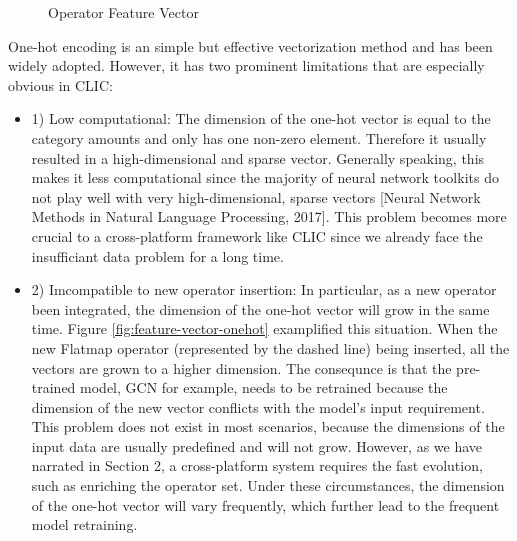 \begin{figure}
  \caption{Operator Feature Vector}
  \label{fig:feature-vector}
\end{figure}

One-hot encoding is an simple but effective vectorization method and has been widely adopted. 
However, it has two prominent limitations that are especially obvious in CLIC:

\begin{itemize}
  \item 1) Low computational: 
  The dimension of the one-hot vector is equal to the category amounts and only has one non-zero element.
  Therefore it usually resulted in a high-dimensional and sparse vector. 
  Generally speaking, this makes it less computational since the majority of neural network toolkits do not play well with very high-dimensional, sparse vectors [Neural Network Methods in Natural Language Processing, 2017]. 
  This problem becomes more crucial to a cross-platform framework like CLIC since we already face the insufficiant data problem for a long time.
  \item 2) Imcompatible to new operator insertion: 
  In particular, as a new operator been integrated, the dimension of the one-hot vector will grow in the same time. 
  Figure \ref{fig:feature-vector-onehot} examplified this situation. 
  When the new Flatmap operator (represented by the dashed line) being inserted, all the vectors are grown to a higher dimension.
  The consequnce is that the pre-trained model, GCN for example, needs to be retrained because the dimension of the new vector conflicts with the model's input requirement.
  This problem does not exist in most scenarios, because the dimensions of the input data are usually predefined and will not grow.
  However, as we have narrated in Section 2, a cross-platform system requires the fast evolution, such as enriching the operator set.
  Under these circumstances, the dimension of the one-hot vector will vary frequently, which further lead to the frequent model retraining.
\end{itemize}

